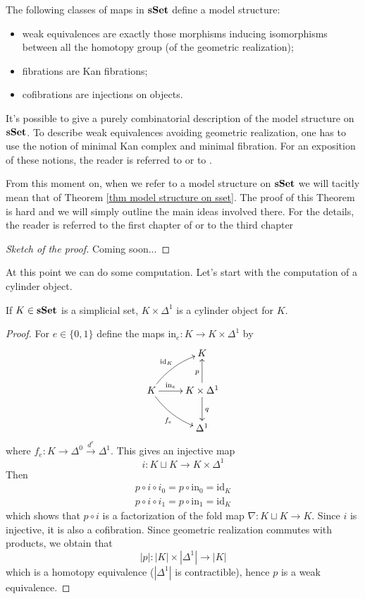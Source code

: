\begin{refsection}
\begin{thm} \label{thm model structure on sset}
The following classes of maps in $\mathbf{sSet}$ define a model structure:
\begin{itemize}
\item weak equivalences are exactly those morphisms inducing isomorphisms between all the homotopy group (of the geometric realization);
\item fibrations are Kan fibrations;
\item cofibrations are injections on objects.
\end{itemize}
\end{thm}

\begin{rmk}
It's possible to give a purely combinatorial description of the model structure on $\mathbf{sSet}$. To describe weak equivalences avoiding geometric realization, one has to use the notion of minimal Kan complex and minimal fibration. For an exposition of these notions, the reader is referred to \cite{may} or to \cite[I.10]{gj}.
\end{rmk}

From this moment on, when we refer to a model structure on $\mathbf{sSet}$ we will tacitly mean that of Theorem \ref{thm model structure on sset}. The proof of this Theorem is hard and we will simply outline the main ideas involved there. For the details, the reader is referred to the first chapter of \cite{gj} or to the third chapter 

\begin{proof}[Sketch of the proof]
Coming soon...
\end{proof}

At this point we can do some computation. Let's start with the computation of a cylinder object.

\begin{prop}
If $K \in \mathbf{sSet}$ is a simplicial set, $K \times \Delta^1$ is a cylinder object for $K$.
\end{prop}

\begin{proof}
For $e \in \{0,1\}$ define the maps $\mathrm{in}_e \colon K \to K \times \Delta^1$ by
\[
\xymatrix{
& K \\
K \ar@/^.5pc/[ur]^{\mathrm{id}_K} \ar@/_.5pc/[dr]_{f_e} \ar[r]^-{\mathrm{in}_e} & K \times \Delta^1 \ar[u]^p \ar[d]^q \\ & \Delta^1
}
\]
where $f_e \colon K \to \Delta^0 \xrightarrow{d^e} \Delta^1$. This gives an injective map
\[
i \colon K \sqcup K \to K \times \Delta^1
\]
Then
\begin{gather*}
p \circ i \circ i_0 = p \circ \mathrm{in}_0 = \mathrm{id}_K \\
p \circ i \circ i_1 = p \circ \mathrm{in}_1 = \mathrm{id}_K
\end{gather*}
which shows that $p \circ i$ is a factorization of the fold map $\nabla \colon K \sqcup K \to K$. Since $i$ is injective, it is also a cofibration. Since geometric realization commutes with products, we obtain that
\[
|p| \colon |K| \times |\Delta^1| \to |K|
\]
which is a homotopy equivalence ($|\Delta^1|$ is contractible), hence $p$ is a weak equivalence.
\end{proof}


\end{refsection}
